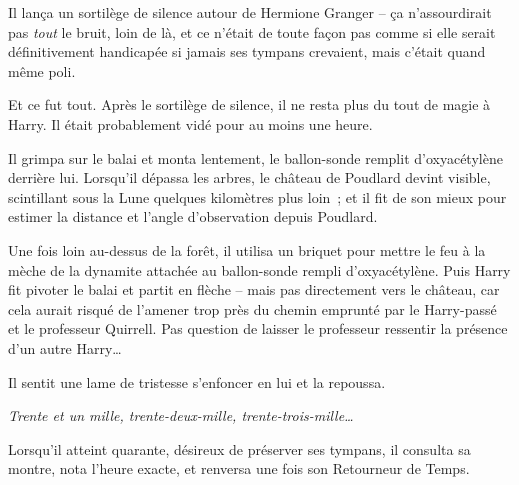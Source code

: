 Il lança un sortilège de silence autour de Hermione Granger -- ça n'assourdirait pas \emph{tout} le bruit, loin de là, et ce n'était de toute façon pas comme si elle serait définitivement handicapée si jamais ses tympans crevaient, mais c'était quand même poli.

Et ce fut tout. Après le sortilège de silence, il ne resta plus du tout de magie à Harry. Il était probablement vidé pour au moins une heure.

Il grimpa sur le balai et monta lentement, le ballon-sonde remplit d'oxyacétylène derrière lui. Lorsqu'il dépassa les arbres, le château de Poudlard devint visible, scintillant sous la Lune quelques kilomètres plus loin~; et il fit de son mieux pour estimer la distance et l'angle d'observation depuis Poudlard.

Une fois loin au-dessus de la forêt, il utilisa un briquet pour mettre le feu à la mèche de la dynamite attachée au ballon-sonde rempli d'oxyacétylène. Puis Harry fit pivoter le balai et partit en flèche -- mais pas directement vers le château, car cela aurait risqué de l'amener trop près du chemin emprunté par le Harry-passé et le professeur Quirrell. Pas question de laisser le professeur ressentir la présence d'un autre Harry…

Il sentit une lame de tristesse s'enfoncer en lui et la repoussa.

\emph{Trente et un mille, trente-deux-mille, trente-trois-mille…}

Lorsqu'il atteint quarante, désireux de préserver ses tympans, il consulta sa montre, nota l'heure exacte, et renversa une fois son Retourneur de Temps.
